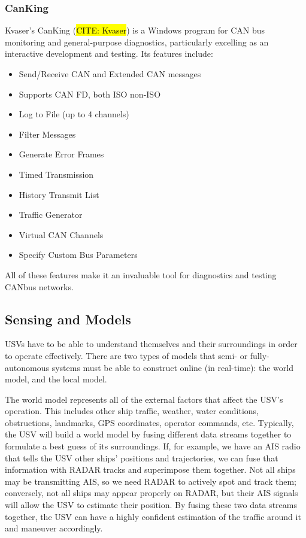 \subsubsection{CanKing}
Kvaser's CanKing (\hl{CITE: Kvaser}) is a Windows program for CAN bus monitoring and general-purpose diagnostics, particularly excelling as an interactive development and testing. Its features include:

\begin{itemize}
    \item Send/Receive CAN and Extended CAN messages
    \item Supports CAN FD, both ISO non-ISO
    \item Log to File (up to 4 channels)
    \item Filter Messages
    \item Generate Error Frames
    \item Timed Transmission 
    \item History Transmit List
    \item Traffic Generator 
    \item Virtual CAN Channels 
    \item Specify Custom Bus Parameters 
\end{itemize}

All of these features make it an invaluable tool for diagnostics and testing CANbus networks.

\subsection{Sensing and Models}
USVs have to be able to understand themselves and their surroundings in order to operate effectively.
There are two types of models that semi- or fully-autonomous systems must be able to construct online (in real-time): the world model, and the local model.

The world model represents all of the external factors that affect the USV's operation.
This includes other ship traffic, weather, water conditions, obstructions, landmarks, GPS coordinates, operator commands, etc.
Typically, the USV will build a world model by fusing different data streams together to formulate a best guess of its surroundings.
If, for example, we have an AIS radio that tells the USV other ships' positions and trajectories, we can fuse that information with RADAR tracks and superimpose them together.
Not all ships may be transmitting AIS, so we need RADAR to actively spot and track them; conversely, not all ships may appear properly on RADAR, but their AIS signals will allow the USV to estimate their position.
By fusing these two data streams together, the USV can have a highly confident estimation of the traffic around it and maneuver accordingly.

